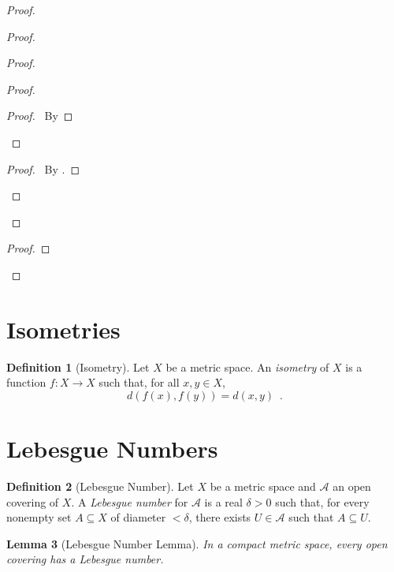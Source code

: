 \documentclass{report}
\let\qed\relax
\newtheorem{lm}{Lemma}[section]
\theoremstyle{definition}
\newtheorem{df}[lm]{Definition}
\begin{document}
\begin{proof}
\begin{proof}
\begin{proof}
\begin{proof}
        \qedstep
        \begin{proof}
          \pf\ By 
        \end{proof}
      \end{proof}
      \qedstep
      \begin{proof}
        \pf\ By .
      \end{proof}
    \end{proof}
  \end{proof}
  \begin{proof}
  \end{proof}
  \qed
\end{proof}

  \section{Isometries}

  \begin{df}[Isometry]
    Let $X$ be a metric space. An \emph{isometry} of $X$ is a function $f : X
    \rightarrow X$ such that, for all $x, y \in X$,
    \[ d(f(x), f(y)) = d(x, y) \enspace . \]
  \end{df}

  \section{Lebesgue Numbers}

  \begin{df}[Lebesgue Number]
    Let $X$ be a metric space and $\mathcal{A}$ an open covering of $X$. A
    \emph{Lebesgue number} for $\mathcal{A}$ is a real $\delta > 0$ such that,
    for every nonempty set $A \subseteq X$ of diameter $< \delta$, there exists
    $U \in \mathcal{A}$ such that $A \subseteq U$.
  \end{df}

  \begin{lm}[Lebesgue Number Lemma]
    In a compact metric space, every open covering has a Lebesgue number.
  \end{lm}
\end{document}
